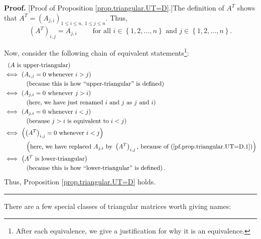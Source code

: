 \documentclass[numbers=enddot,12pt,final,onecolumn,notitlepage]{scrartcl}%
\theoremstyle{definition}
\newenvironment{proof}[1][Proof]{\noindent\textbf{#1.} }{\ \rule{0.5em}{0.5em}}
\begin{document}
\begin{proof}
[Proof of Proposition \ref{prop.triangular.UT=D}.]The definition of $A^{T}$
shows that $A^{T}=\left(  A_{j,i}\right)  _{1\leq i\leq n,\ 1\leq j\leq n}$.
Thus,%
\begin{equation}
\left(  A^{T}\right)  _{i,j}=A_{j,i}\ \ \ \ \ \ \ \ \ \ \text{for all }%
i\in\left\{  1,2,\ldots,n\right\}  \text{ and }j\in\left\{  1,2,\ldots
,n\right\}  . \label{pf.prop.triangular.UT=D.1}%
\end{equation}


Now, consider the following chain of equivalent statements\footnote{After each
equivalence, we give a justification for why it is an equivalence.}:%
\begin{align*}
&  \ \left(  A\text{ is upper-triangular}\right) \\
&  \Longleftrightarrow\ \left(  A_{i,j}=0\text{ whenever }i>j\right) \\
&  \ \ \ \ \ \ \ \ \ \ \left(  \text{because this is how \textquotedblleft
upper-triangular\textquotedblright\ is defined}\right) \\
&  \Longleftrightarrow\ \left(  A_{j,i}=0\text{ whenever }j>i\right) \\
&  \ \ \ \ \ \ \ \ \ \ \left(  \text{here, we have just renamed }i\text{ and
}j\text{ as }j\text{ and }i\right) \\
&  \Longleftrightarrow\ \left(  A_{j,i}=0\text{ whenever }i<j\right) \\
&  \ \ \ \ \ \ \ \ \ \ \left(  \text{because }j>i\text{ is equivalent to
}i<j\right) \\
&  \Longleftrightarrow\ \left(  \left(  A^{T}\right)  _{i,j}=0\text{ whenever
}i<j\right) \\
&  \ \ \ \ \ \ \ \ \ \ \left(  \text{here, we have replaced }A_{j,i}\text{ by
}\left(  A^{T}\right)  _{i,j}\text{, because of
(\ref{pf.prop.triangular.UT=D.1})}\right) \\
&  \Longleftrightarrow\ \left(  A^{T}\text{ is lower-triangular}\right) \\
&  \ \ \ \ \ \ \ \ \ \ \left(  \text{because this is how \textquotedblleft
lower-triangular\textquotedblright\ is defined}\right)  .
\end{align*}
Thus, Proposition \ref{prop.triangular.UT=D} holds.
\end{proof}

There are a few special classes of triangular matrices worth giving names:
\end{document}
